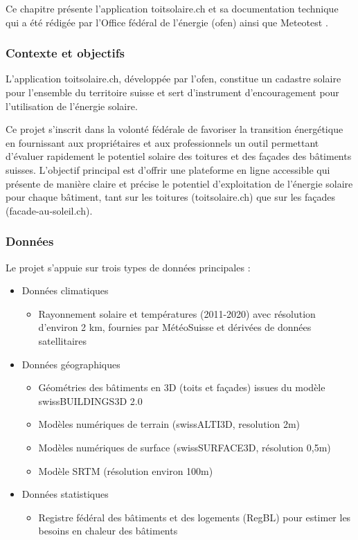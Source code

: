 Ce chapitre présente l'application toitsolaire.ch \cite{bfe_wie_nodate} et sa documentation technique \cite{klauser_energie_nodate} qui a été rédigée par l'Office fédéral de l'énergie (\acrshort{ofen}) ainsi que Meteotest \cite{meteotest_wir_2025}.

\subsubsection{Contexte et objectifs}
L'application toitsolaire.ch, développée par l'\acrshort{ofen}, constitue un cadastre solaire pour l'ensemble du territoire suisse et sert d'instrument d'encouragement pour l'utilisation de l'énergie solaire.

Ce projet s'inscrit dans la volonté fédérale de favoriser la transition énergétique en fournissant aux propriétaires et aux professionnels un outil permettant d'évaluer rapidement le potentiel solaire des toitures et des façades des bâtiments suisses. L'objectif principal est d'offrir une plateforme en ligne accessible qui présente de manière claire et précise le potentiel d'exploitation de l'énergie solaire pour chaque bâtiment, tant sur les toitures (toitsolaire.ch) que sur les façades (facade-au-soleil.ch).

\subsubsection{Données}
\par{Le projet s'appuie sur trois types de données principales :}
\begin{itemize}
    \item Données climatiques
    \begin{itemize}
        \item Rayonnement solaire et températures (2011-2020) avec résolution d'environ 2 km, fournies par MétéoSuisse et dérivées de données satellitaires
    \end{itemize}
    \item Données géographiques
    \begin{itemize}
        \item Géométries des bâtiments en 3D (toits et façades) issues du modèle swissBUILDINGS3D 2.0
        \item Modèles numériques de terrain (swissALTI3D, resolution 2m)
        \item Modèles numériques de surface (swissSURFACE3D, résolution 0,5m)
        \item Modèle SRTM (résolution environ 100m)
    \end{itemize}
    \item Données statistiques
        \begin{itemize}
        \item Registre fédéral des bâtiments et des logements (RegBL) pour estimer les besoins en chaleur des bâtiments
        \end{itemize}
    \end{itemize}

